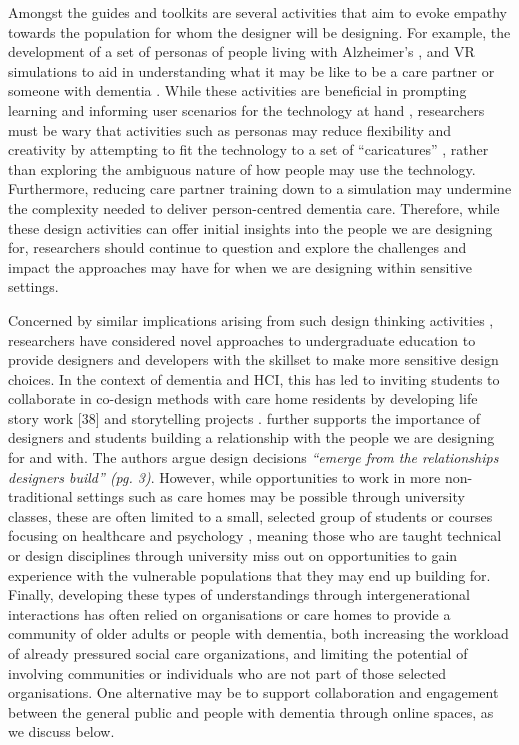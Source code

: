 Amongst the guides and toolkits are several activities that aim to evoke empathy towards the population for whom the designer will be designing.  For example, the development of a set of personas of people living with Alzheimer’s \citep{jais_evidence_2018}, and VR simulations to aid in understanding what it may be like to be a care partner or someone with dementia \citep{hirt_use_2020}. While these activities are beneficial in prompting learning and informing user scenarios for the technology at hand \citep{vines_age-old_2015}, researchers must be wary that activities such as personas may reduce flexibility and creativity by attempting to fit the technology to a set of “caricatures” \citep{redstrom_towards_2006}, rather than exploring the ambiguous nature of how people may use the technology. Furthermore, reducing care partner training down to a simulation may undermine the complexity needed to deliver person-centred dementia care. Therefore, while these design activities can offer initial insights into the people we are designing for, researchers should continue to question and explore the challenges and impact the approaches may have for when we are designing within sensitive settings.

Concerned by similar implications arising from such design thinking activities \citep{bennett_promise_2019}, researchers have considered novel approaches to undergraduate education to provide designers and developers with the skillset to make more sensitive design choices. In the context of dementia and HCI, this has led to inviting students to collaborate in co-design methods with care home residents by developing life story work [38] and storytelling projects \citep{hannan_zeitgeist_2019}. \cite{hendriks_valuing_2018} further supports the importance of designers and students building a relationship with the people we are designing for and with. The authors argue design decisions \textit{“emerge from the relationships designers build” (pg. 3)}\citep{hendriks_valuing_2018}. However, while opportunities to work in more non-traditional settings such as care homes may be possible through university classes, these are often limited to a small, selected group of students or courses focusing on healthcare and psychology \citep{kinnunen_understanding_2018}, meaning those who are taught technical or design disciplines through university miss out on opportunities to gain experience with the  vulnerable populations that they may end up building for. Finally, developing these types of understandings through intergenerational interactions has often relied on organisations or care homes to provide a community of older adults or people with dementia, both increasing the workload of already pressured social care organizations, and limiting the potential of involving communities or individuals who are not part of those selected organisations. One alternative may be to support collaboration and engagement between the general public and people with dementia through online spaces, as we discuss below.  

